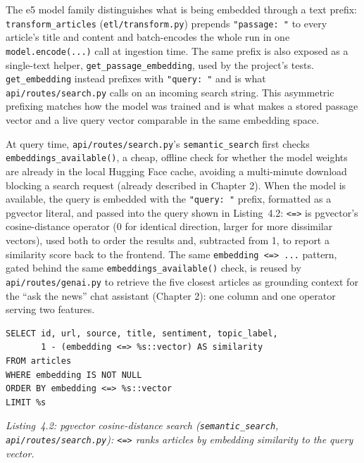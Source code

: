 The e5 model family distinguishes what is being embedded through a text prefix: \texttt{transform\_articles} (\texttt{etl/transform.py}) prepends \texttt{"passage: "} to every article's title and content and batch-encodes the whole run in one \texttt{model.encode(...)} call at ingestion time. The same prefix is also exposed as a single-text helper, \texttt{get\_passage\_embedding}, used by the project's tests. \texttt{get\_embedding} instead prefixes with \texttt{"query: "} and is what \texttt{api/routes/search.py} calls on an incoming search string. This asymmetric prefixing matches how the model was trained and is what makes a stored passage vector and a live query vector comparable in the same embedding space.

At query time, \texttt{api/routes/search.py}'s \texttt{semantic\_search} first checks \texttt{embeddings\_available()}, a cheap, offline check for whether the model weights are already in the local Hugging Face cache, avoiding a multi-minute download blocking a search request (already described in Chapter 2). When the model is available, the query is embedded with the \texttt{"query: "} prefix, formatted as a pgvector literal, and passed into the query shown in Listing~4.2: \texttt{<=>} is pgvector's cosine-distance operator (0 for identical direction, larger for more dissimilar vectors), used both to order the results and, subtracted from 1, to report a similarity score back to the frontend. The same \texttt{embedding <=> ...} pattern, gated behind the same \texttt{embeddings\_available()} check, is reused by \texttt{api/routes/genai.py} to retrieve the five closest articles as grounding context for the ``ask the news'' chat assistant (Chapter 2): one column and one operator serving two features.

\begin{verbatim}
SELECT id, url, source, title, sentiment, topic_label,
       1 - (embedding <=> %s::vector) AS similarity
FROM articles
WHERE embedding IS NOT NULL
ORDER BY embedding <=> %s::vector
LIMIT %s
\end{verbatim}
\begin{center}
\textit{Listing~4.2: pgvector cosine-distance search (\texttt{semantic\_search}, \texttt{api/routes/search.py}): \texttt{<=>} ranks articles by embedding similarity to the query vector.}
\end{center}

